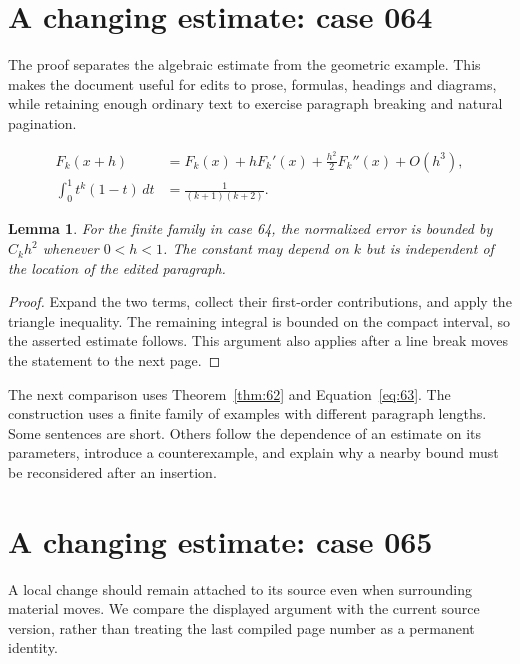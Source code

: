 \documentclass[a4paper,10pt]{article}
\newtheorem{lemma}[theorem]{Lemma}
\begin{document}
\lipsum[13]

\section{A changing estimate: case 064}\label{unit:63}
The proof separates the algebraic estimate from the geometric example. This makes the document useful for edits to prose, formulas, headings and diagrams, while retaining enough ordinary text to exercise paragraph breaking and natural pagination.

\lipsum[10-11]
\begin{align}\label{eq:63}
 F_k(x+h)&=F_k(x)+hF_k'(x)+\frac{h^2}{2}F_k''(x)+O(h^3),\\
 \int_0^1 t^k(1-t)\,dt&=\frac{1}{(k+1)(k+2)}.
\end{align}
\begin{lemma}\label{thm:63}
For the finite family in case 64, the normalized error is bounded by $C_k h^2$ whenever $0<h<1$. The constant may depend on $k$ but is independent of the location of the edited paragraph.
\end{lemma}
\begin{proof}
Expand the two terms, collect their first-order contributions, and apply the
triangle inequality. The remaining integral is bounded on the compact interval,
so the asserted estimate follows. This argument also applies after a line break
moves the statement to the next page.
\end{proof}
\begin{center}
\end{center}
The next comparison uses Theorem~\ref{thm:62} and Equation~\ref{eq:63}. The construction uses a finite family of examples with different paragraph lengths. Some sentences are short. Others follow the dependence of an estimate on its parameters, introduce a counterexample, and explain why a nearby bound must be reconsidered after an insertion.

\lipsum[18]

\section{A changing estimate: case 065}\label{unit:64}
A local change should remain attached to its source even when surrounding material moves. We compare the displayed argument with the current source version, rather than treating the last compiled page number as a permanent identity.
\end{document}
